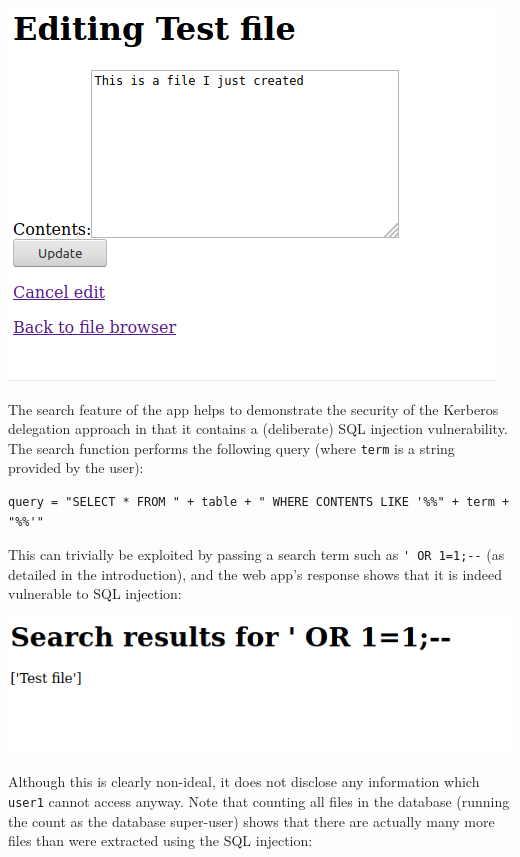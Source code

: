 \documentclass{article}
\begin{document}
\begin{center}
  \includegraphics[scale=0.5]{07-browser3-file-contents.png}
\end{center}

The search feature of the app helps to demonstrate the security of the Kerberos delegation approach in that it contains a (deliberate) SQL injection vulnerability. The search function performs the following query (where \texttt{term} is a string provided by the user):

\begin{verbatim}
query = "SELECT * FROM " + table + " WHERE CONTENTS LIKE '%%" + term + "%%'"
\end{verbatim}

This can trivially be exploited by passing a search term such as \verb+' OR 1=1;--+ (as detailed in the introduction), and the web app's response shows that it is indeed vulnerable to SQL injection:

\begin{center}
  \includegraphics[scale=0.5]{08-browser4-sql.png}
\end{center}

Although this is clearly non-ideal, it does not disclose any information which \texttt{user1} cannot access anyway. Note that counting all files in the database (running the count as the database super-user) shows that there are actually many more files than were extracted using the SQL injection:
\end{document}
